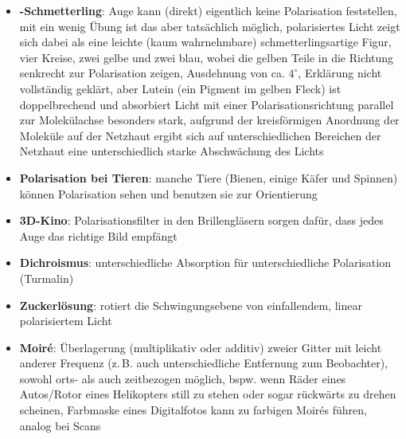 \begin{itemize}
    \item
    \textbf{-Schmetterling}:
    Auge kann (direkt) eigentlich keine Polarisation feststellen,
    mit ein wenig Übung ist das aber tatsächlich möglich,
    polarisiertes Licht zeigt sich dabei als eine leichte
    (kaum wahrnehmbare) schmetterlingsartige Figur,
    vier Kreise, zwei gelbe und zwei blau, wobei die gelben Teile in
    die Richtung senkrecht zur Polarisation zeigen,
    Ausdehnung von ca. $4^\circ$,
    Erklärung nicht vollständig geklärt,
    aber Lutein (ein Pigment im gelben Fleck) ist doppelbrechend und
    absorbiert Licht mit einer Polarisationsrichtung parallel zur Molekülachse
    besonders stark, aufgrund der kreisförmigen Anordnung der Moleküle
    auf der Netzhaut ergibt sich auf unterschiedlichen Bereichen der Netzhaut
    eine unterschiedlich starke Abschwächung des Lichts

    \item
    \textbf{Polarisation bei Tieren}:
    manche Tiere (Bienen, einige Käfer und Spinnen) können Polarisation sehen
    und benutzen sie zur Orientierung

    \item
    \textbf{3D-Kino}:
    Polarisationsfilter in den Brillengläsern sorgen dafür, dass jedes Auge
    das richtige Bild empfängt

    \item
    \textbf{Dichroismus}:
    unterschiedliche Absorption für unterschiedliche Polarisation
    (Turmalin)

    \item
    \textbf{Zuckerlösung}:
    rotiert die Schwingungsebene von einfallendem, linear polarisiertem Licht
\end{itemize}
\linie
\begin{itemize}
    \item
    \textbf{Moiré}:
    Überlagerung (multiplikativ oder additiv) zweier Gitter mit leicht
    anderer Frequenz
    (z.\,B. auch unterschiedliche Entfernung zum Beobachter),
    sowohl orts- als auch zeitbezogen möglich,
    bspw. wenn Räder eines Autos/Rotor eines Helikopters still zu stehen oder
    sogar rückwärts zu drehen scheinen,
    Farbmaske eines Digitalfotos kann zu farbigen Moirés führen,
    analog bei Scans
\end{itemize}

\pagebreak
